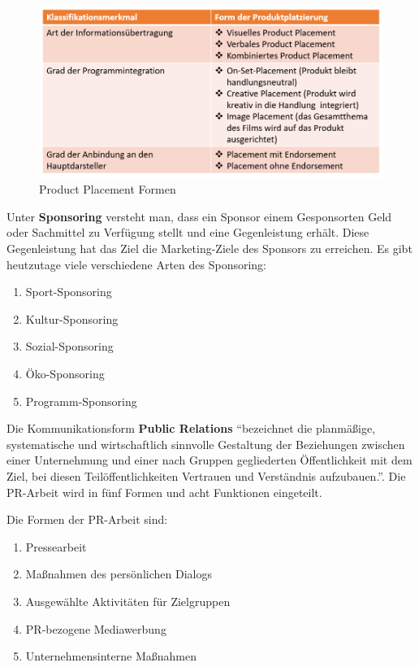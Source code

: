 \begin{figure}[H]
	\centering
	\includegraphics[width=1.0\linewidth]{img/ProductPlacement}
	\caption[Product Placement Formen]{Product Placement Formen}
	\label{fig:productplacement}
\end{figure}


Unter \textbf{Sponsoring} versteht man, dass ein Sponsor einem Gesponsorten Geld oder Sachmittel zu Verfügung stellt und eine Gegenleistung erhält. Diese Gegenleistung hat das Ziel die Marketing-Ziele des Sponsors zu erreichen. Es gibt heutzutage viele verschiedene Arten des Sponsoring:

\begin{enumerate}
	\item Sport-Sponsoring
	\item Kultur-Sponsoring
	\item Sozial-Sponsoring
	\item Öko-Sponsoring
	\item Programm-Sponsoring
\end{enumerate}

Die Kommunikationsform \textbf{Public Relations} \enquote{bezeichnet die planmäßige, systematische und wirtschaftlich sinnvolle  Gestaltung  der  Beziehungen  zwischen  einer  Unternehmung  und  einer  nach Gruppen gegliederten Öffentlichkeit mit dem Ziel, bei diesen Teilöffentlichkeiten Vertrauen und Verständnis aufzubauen.}.
Die PR-Arbeit wird in fünf Formen und acht Funktionen eingeteilt.

Die Formen der PR-Arbeit sind:

\begin{enumerate}
	\item Pressearbeit
	\item Maßnahmen  des  persönlichen  Dialogs
	\item Ausgewählte  Aktivitäten  für  Zielgruppen
	\item PR-bezogene  Mediawerbung
	\item Unternehmensinterne Maßnahmen
\end{enumerate}


